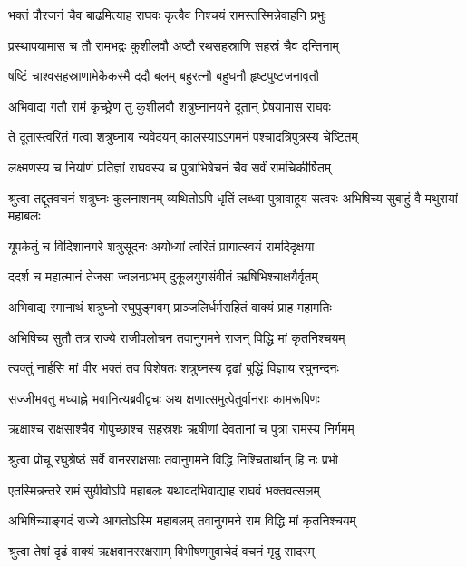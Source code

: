 \twolineshloka
{भक्तं पौरजनं चैव बाढमित्याह राघवः}
{कृत्वैव निश्चयं रामस्तस्मिन्नेवाहनि प्रभुः} %

\twolineshloka
{प्रस्थापयामास च तौ रामभद्रः कुशीलवौ}
{अष्टौ रथसहस्राणि सहस्रं चैव दन्तिनाम्} %

\twolineshloka
{षष्टिं चाश्वसहस्राणामेकैकस्मै ददौ बलम्}
{बहुरत्नौ बहुधनौ हृष्टपुष्टजनावृतौ} %

\twolineshloka
{अभिवाद्य गतौ रामं कृच्छ्रेण तु कुशीलवौ}
{शत्रुघ्नानयने दूतान् प्रेषयामास राघवः} %

\twolineshloka
{ते दूतास्त्वरितं गत्वा शत्रुघ्नाय न्यवेदयन्}
{कालस्याऽऽगमनं पश्चादत्रिपुत्रस्य चेष्टितम्} %

\twolineshloka
{लक्ष्मणस्य च निर्याणं प्रतिज्ञां राघवस्य च}
{पुत्राभिषेचनं चैव सर्वं रामचिकीर्षितम्} %

\threelineshloka
{श्रुत्वा तद्दूतवचनं शत्रुघ्नः कुलनाशनम्}
{व्यथितोऽपि धृतिं लब्ध्वा पुत्रावाहूय सत्वरः}
{अभिषिच्य सुबाहुं वै मथुरायां महाबलः} %

\twolineshloka
{यूपकेतुं च विदिशानगरे शत्रुसूदनः}
{अयोध्यां त्वरितं प्रागात्स्वयं रामदिदृक्षया} %

\twolineshloka
{ददर्श च महात्मानं तेजसा ज्वलनप्रभम्}
{दुकूलयुगसंवीतं ऋषिभिश्चाक्षयैर्वृतम्} %

\twolineshloka
{अभिवाद्य रमानाथं शत्रुघ्नो रघुपुङ्गवम्}
{प्राञ्जलिर्धर्मसहितं वाक्यं प्राह महामतिः} %

\twolineshloka
{अभिषिच्य सुतौ तत्र राज्ये राजीवलोचन}
{तवानुगमने राजन् विद्धि मां कृतनिश्चयम्} %

\twolineshloka
{त्यक्तुं नार्हसि मां वीर भक्तं तव विशेषतः}
{शत्रुघ्नस्य दृढां बुद्धिं विज्ञाय रघुनन्दनः} %

\twolineshloka
{सज्जीभवतु मध्याह्ने भवानित्यब्रवीद्वचः}
{अथ क्षणात्समुत्पेतुर्वानराः कामरूपिणः} %

\twolineshloka
{ऋक्षाश्च राक्षसाश्चैव गोपुच्छाश्च सहस्रशः}
{ऋषीणां देवतानां च पुत्रा रामस्य निर्गमम्} %

\twolineshloka
{श्रुत्वा प्रोचू रघुश्रेष्ठं सर्वे वानरराक्षसाः}
{तवानुगमने विद्धि निश्चितार्थान् हि नः प्रभो} %

\twolineshloka
{एतस्मिन्नन्तरे रामं सुग्रीवोऽपि महाबलः}
{यथावदभिवाद्याह राघवं भक्तवत्सलम्} %

\twolineshloka
{अभिषिच्याङ्गदं राज्ये आगतोऽस्मि महाबलम्}
{तवानुगमने राम विद्धि मां कृतनिश्चयम्} %

\twolineshloka
{श्रुत्वा तेषां दृढं वाक्यं ऋक्षवानररक्षसाम्}
{विभीषणमुवाचेदं वचनं मृदु सादरम्} %


